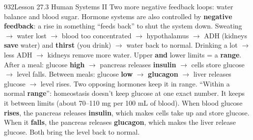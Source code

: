 \documentclass[11pt,letterpaper]{article}
\begin{document}
\begin{tbpage}{932}{Lesson 27.3 Human Systems II}
  {Two more negative feedback loops: water balance and blood sugar.}
    {Hormone systems are also controlled by \textbf{negative feedback}: a rise in something ``feeds back'' to shut the system down.}
    {Sweating $\rightarrow$ water lost $\rightarrow$ blood too concentrated $\rightarrow$ hypothalamus $\rightarrow$ ADH (kidneys \textbf{save} water) and \textbf{thirst} (you drink) $\rightarrow$ water back to normal. Drinking a lot $\rightarrow$ less ADH $\rightarrow$ kidneys remove more water. Upper \textbf{and} lower limits = a \textbf{range}.}
    {After a meal: glucose \textbf{high} $\rightarrow$ pancreas releases \textbf{insulin} $\rightarrow$ cells store glucose $\rightarrow$ level falls. Between meals: glucose \textbf{low} $\rightarrow$ \textbf{glucagon} $\rightarrow$ liver releases glucose $\rightarrow$ level rises. Two opposing hormones keep it in range.}
    {``Within a normal \textbf{range}'': homeostasis doesn't keep glucose at one exact number. It keeps it between limits (about 70–110 mg per 100 mL of blood).}
    {When blood glucose \textbf{rises}, the pancreas releases \textbf{insulin}, which makes cells take up and store glucose. When it \textbf{falls}, the pancreas releases \textbf{glucagon}, which makes the liver release glucose. Both bring the level back to normal.}
\end{tbpage}
\end{document}
